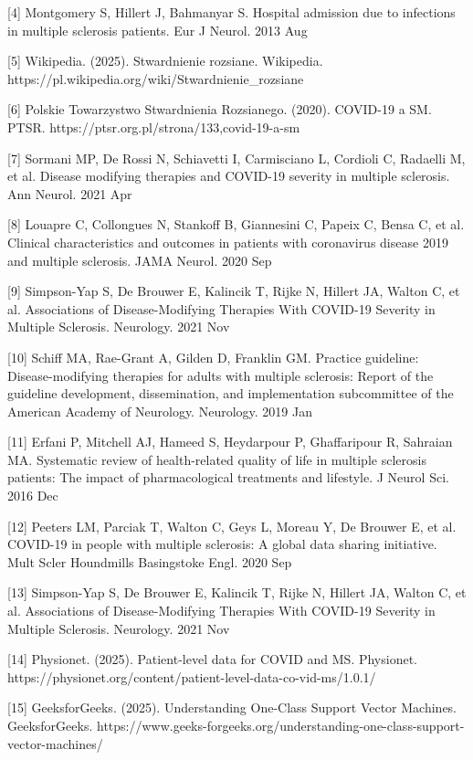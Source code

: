 \documentclass[a4paper,fleqn]{cas-dc}
\begin{document}
[4] Montgomery S, Hillert J, Bahmanyar S. Hospital admission due to infections in multiple sclerosis patients. Eur J Neurol. 2013 Aug

[5] Wikipedia. (2025). Stwardnienie rozsiane. Wikipedia. https://pl.wikipedia.org/wiki/Stwardnienie\_rozsiane

[6] Polskie Towarzystwo Stwardnienia Rozsianego. (2020). COVID-19 a SM. PTSR. https://ptsr.org.pl/strona/133,covid-19-a-sm

[7] Sormani MP, De Rossi N, Schiavetti I, Carmisciano L, Cordioli C, Radaelli M, et al. Disease modifying therapies and COVID-19 severity in multiple sclerosis. Ann Neurol. 2021 Apr

[8] Louapre C, Collongues N, Stankoff B, Giannesini C, Papeix C, Bensa C, et al. Clinical characteristics and outcomes in patients with coronavirus disease 2019 and multiple sclerosis. JAMA Neurol. 2020 Sep

[9] Simpson-Yap S, De Brouwer E, Kalincik T, Rijke N, Hillert JA, Walton C, et al. Associations of Disease-Modifying Therapies With COVID-19 Severity in Multiple Sclerosis. Neurology. 2021 Nov

[10] Schiff MA, Rae-Grant A, Gilden D, Franklin GM. Practice guideline: Disease-modifying therapies for adults with multiple sclerosis: Report of the guideline development, dissemination, and implementation subcommittee of the American Academy of Neurology. Neurology. 2019 Jan

[11] Erfani P, Mitchell AJ, Hameed S, Heydarpour P, Ghaffaripour R, Sahraian MA. Systematic review of health-related quality of life in multiple sclerosis patients: The impact of pharmacological treatments and lifestyle. J Neurol Sci. 2016 Dec

[12] Peeters LM, Parciak T, Walton C, Geys L, Moreau Y, De Brouwer E, et al. COVID-19 in people with multiple sclerosis: A global data sharing initiative. Mult Scler Houndmills Basingstoke Engl. 2020 Sep

[13] Simpson-Yap S, De Brouwer E, Kalincik T, Rijke N, Hillert JA, Walton C, et al. Associations of Disease-Modifying Therapies With COVID-19 Severity in Multiple Sclerosis.  Neurology. 2021 Nov

[14] Physionet. (2025). Patient-level data for COVID and MS. Physionet. https://physionet.org/content/patient-level-data-co-vid-ms/1.0.1/

[15] GeeksforGeeks. (2025). Understanding One-Class Support Vector Machines. GeeksforGeeks. https://www.geeks-forgeeks.org/understanding-one-class-support-vector-machines/
\end{document}
